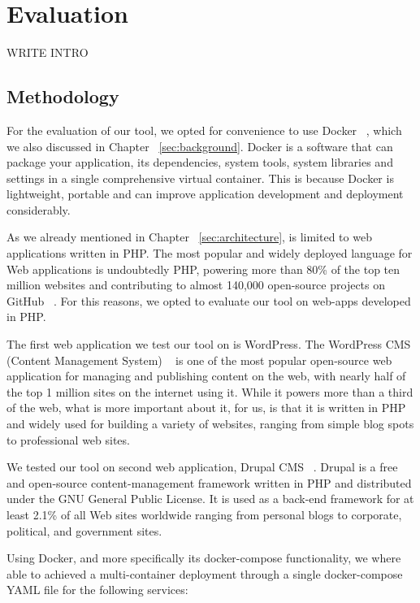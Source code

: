\chapter{Evaluation}
\label{sec:evaluation}
\minitoc
\vspace*{1cm}

WRITE INTRO

\section{Methodology}
\label{sec:dockerStack}
For the evaluation of our tool, we opted for convenience to use Docker ~\cite{docker_def}, which we also discussed in Chapter ~\ref{sec:background}. Docker is a software that can package your application, its dependencies, system tools, system libraries and settings in a single comprehensive virtual container. This is because Docker is lightweight, portable and can improve application development and deployment considerably.

As we already mentioned in Chapter ~\ref{sec:architecture}, \pname{} is limited to web applications written in PHP. The most popular and widely deployed language for Web applications is undoubtedly PHP, powering more than 80\% of the top ten million websites and contributing to almost 140,000 open-source projects on GitHub ~\cite{githubinfo}. For this reasons, we opted to evaluate our tool on web-apps developed in PHP.

The first web application we test our tool on is WordPress. The WordPress CMS (Content Management System) ~\cite{docker_def} is one of the most popular open-source web application for managing and publishing content on the web, with nearly half of the top 1 million sites on the internet using it. While it powers more than a third of the web, what is more important about it, for us, is that it is written in PHP and widely used for building a variety of websites, ranging from simple blog spots to professional web sites. 

We tested our tool on second web application, Drupal CMS ~\cite{drupal}. Drupal is a free and open-source content-management framework written in PHP and distributed under the GNU General Public License. It is used as a back-end framework for at least 2.1\% of all Web sites worldwide ranging from personal blogs to corporate, political, and government sites.

Using Docker, and more specifically its docker-compose functionality, we where able to achieved a multi-container deployment through a single docker-compose YAML file for the following services:

